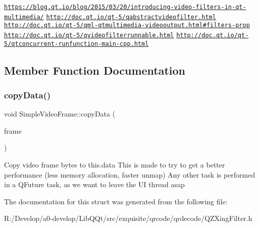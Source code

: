 \href{https://blog.qt.io/blog/2015/03/20/introducing-video-filters-in-qt-multimedia/}{\tt https\+://blog.\+qt.\+io/blog/2015/03/20/introducing-\/video-\/filters-\/in-\/qt-\/multimedia/} \href{http://doc.qt.io/qt-5/qabstractvideofilter.html}{\tt http\+://doc.\+qt.\+io/qt-\/5/qabstractvideofilter.\+html} \href{http://doc.qt.io/qt-5/qml-qtmultimedia-videooutput.html#filters-prop}{\tt http\+://doc.\+qt.\+io/qt-\/5/qml-\/qtmultimedia-\/videooutput.\+html\#filters-\/prop} \href{http://doc.qt.io/qt-5/qvideofilterrunnable.html}{\tt http\+://doc.\+qt.\+io/qt-\/5/qvideofilterrunnable.\+html} \href{http://doc.qt.io/qt-5/qtconcurrent-runfunction-main-cpp.html}{\tt http\+://doc.\+qt.\+io/qt-\/5/qtconcurrent-\/runfunction-\/main-\/cpp.\+html} 

\subsection{Member Function Documentation}
\mbox{\label{struct_simple_video_frame_a6e6bff50e72a9b5e424038d482e41475}} 
\subsubsection{\texorpdfstring{copy\+Data()}{copyData()}}
{\footnotesize\ttfamily void Simple\+Video\+Frame\+::copy\+Data (\begin{DoxyParamCaption}\item[{Q\+Video\+Frame \&}]{frame }\end{DoxyParamCaption})\hspace{0.3cm}{\ttfamily [inline]}}

Copy video frame bytes to this.\+data This is made to try to get a better performance (less memory allocation, faster unmap) Any other task is performed in a Q\+Future task, as we want to leave the UI thread asap 

The documentation for this struct was generated from the following file\+:\begin{DoxyCompactItemize}
\item 
R\+:/\+Develop/a0-\/develop/\+Lib\+Q\+Qt/src/exquisite/qrcode/qrdecode/Q\+Z\+Xing\+Filter.\+h\end{DoxyCompactItemize}
